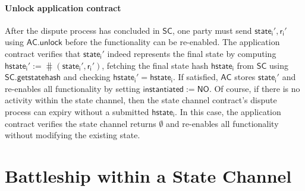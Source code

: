 \documentclass{llncs}
\newcommand{\instantiated}{\mathsf{instantiated}}
\newcommand{\instantiatedno}{\mathsf{NO}}
\newcommand{\hstatei}{\mathsf{hstate}_{\monotoniccounter}}
\newcommand{\monotoniccounter}{\mathsf{i}}
\newcommand{\stateinfoi}{\mathsf{state}_{\mathsf{i}}}
\newcommand{\rani}{\mathsf{r}_{\mathsf{i}}}
\newcommand{\statechannel}{\mathsf{SC}}
\newcommand{\statechannelgetcommitment}{\mathsf{SC}.\mathsf{getstatehash}}
\newcommand{\appcontract}{\mathsf{AC}}
\newcommand{\appunlock}{\mathsf{AC.unlock}}
\begin{document}
\paragraph{Unlock application contract}

After the dispute process has concluded in $\statechannel$, one party must send  $\stateinfoi',\rani'$ using $\appunlock$ before the functionality can be re-enabled.
The application contract verifies that $\stateinfoi'$  indeed represents the final state by computing $\hstatei' := \hash(\stateinfoi', \rani')$, fetching the final state hash $\hstatei$ from $\statechannel$ using $\statechannelgetcommitment$ and checking  $\hstatei' = \hstatei$. 
If satisfied, $\appcontract$ stores $\stateinfoi'$ and re-enables all functionality by setting $\instantiated :=  \instantiatedno$. 
Of course, if there is no activity within the state channel, then the state channel contract's dispute process can expiry without a submitted $\hstatei$.
In this case, the application contract verifies the state channel returns $\emptyset$ and re-enables all functionality without modifying the existing state. 



\section{Battleship within a State Channel} 
\end{document}
